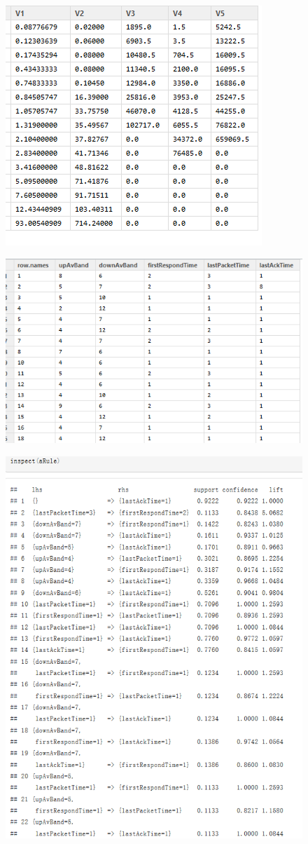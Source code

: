 \begin{figure}[H]
\centering
\includegraphics[width=0.7\linewidth]{images/max-min3}
\caption{}
\label{fig:max-min3}
\end{figure}
\begin{figure}[H]
\centering
\includegraphics[width=0.7\linewidth]{images/max-min4}
\caption{}
\label{fig:max-min4}
\end{figure}

\begin{figure}[H]
\centering
\includegraphics[width=0.7\linewidth]{images/AR}
\caption{}
\label{fig:AR}
\end{figure}











